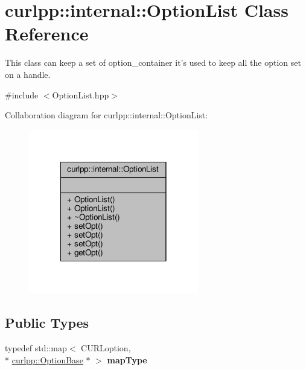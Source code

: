 \hypertarget{classcurlpp_1_1internal_1_1OptionList}{\section{curlpp\-:\-:internal\-:\-:Option\-List Class Reference}
\label{classcurlpp_1_1internal_1_1OptionList}
}


This class can keep a set of option\-\_\-container it's used to keep all the option set on a handle.  




{\ttfamily \#include $<$Option\-List.\-hpp$>$}



Collaboration diagram for curlpp\-:\-:internal\-:\-:Option\-List\-:\nopagebreak
\begin{figure}[H]
\begin{center}
\leavevmode
\includegraphics[width=210pt]{classcurlpp_1_1internal_1_1OptionList__coll__graph}
\end{center}
\end{figure}
\subsection*{Public Types}
\begin{DoxyCompactItemize}
\item 
\hypertarget{classcurlpp_1_1internal_1_1OptionList_a13b11635f4da1d42cde784135e4b95de}{typedef std\-::map$<$ C\-U\-R\-Loption, \\*
\hyperlink{classcurlpp_1_1OptionBase}{curlpp\-::\-Option\-Base} $\ast$ $>$ {\bfseries map\-Type}}\label{classcurlpp_1_1internal_1_1OptionList_a13b11635f4da1d42cde784135e4b95de}

\end{DoxyCompactItemize}
